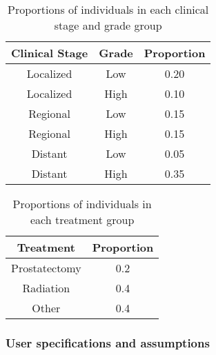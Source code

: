 \documentclass[11pt]{article}
\begin{document}
\begin{table}[!ht]
\centering
\begin{tabular}{ccc}
  \hline
Clinical Stage & Grade & Proportion \\ 
  \hline
Localized & Low & 0.20 \\ 
  Localized & High & 0.10 \\ 
  Regional & Low & 0.15 \\ 
  Regional & High & 0.15 \\ 
  Distant & Low & 0.05 \\ 
  Distant & High & 0.35 \\ 
   \hline
\end{tabular}
\caption{Proportions of individuals in each clinical stage and grade group} 
\label{tab:sg}
\end{table}
\begin{table}[!ht]
\centering
\begin{tabular}{cc}
  \hline
Treatment & Proportion \\ 
  \hline
Prostatectomy & 0.2 \\ 
  Radiation & 0.4 \\ 
  Other & 0.4 \\ 
   \hline
\end{tabular}
\caption{Proportions of individuals in each treatment group} 
\label{tab:tx}
\end{table}
\subsubsection{User specifications and assumptions}
\end{document}
